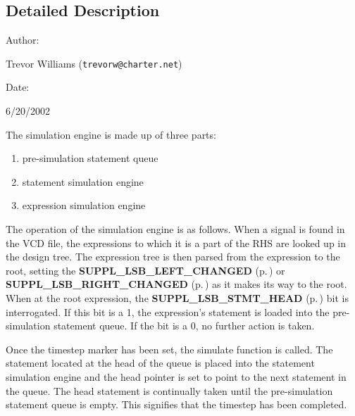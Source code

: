 \subsection{Detailed Description}


\begin{Desc}
\item[Author: ]\par
Trevor Williams ({\tt trevorw@charter.net}) \end{Desc}
\begin{Desc}
\item[Date: ]\par
6/20/2002

 The simulation engine is made up of three parts:\begin{enumerate}
\item 
pre-simulation statement queue\item 
statement simulation engine\item 
expression simulation engine\end{enumerate}
\end{Desc}


 The operation of the simulation engine is as follows. When a signal is found in the VCD file, the expressions to which it is a part of the RHS are looked up in the design tree. The expression tree is then parsed from the expression to the root, setting the {\bf SUPPL\_\-LSB\_\-LEFT\_\-CHANGED} {\rm (p.\,\pageref{group__expr__suppl_a9})} or {\bf SUPPL\_\-LSB\_\-RIGHT\_\-CHANGED} {\rm (p.\,\pageref{group__expr__suppl_a10})} as it  makes its way to the root. When at the root expression, the {\bf SUPPL\_\-LSB\_\-STMT\_\-HEAD} {\rm (p.\,\pageref{group__expr__suppl_a4})}  bit is interrogated. If this bit is a 1, the expression's statement is loaded  into the pre-simulation statement queue. If the bit is a 0, no further action is  taken.

 Once the timestep marker has been set, the simulate function is called. The  statement located at the head of the queue is placed into the statement simulation  engine and the head pointer is set to point to the next statement in the queue.  The head statement is continually taken until the pre-simulation statement queue  is empty. This signifies that the timestep has been completed.


